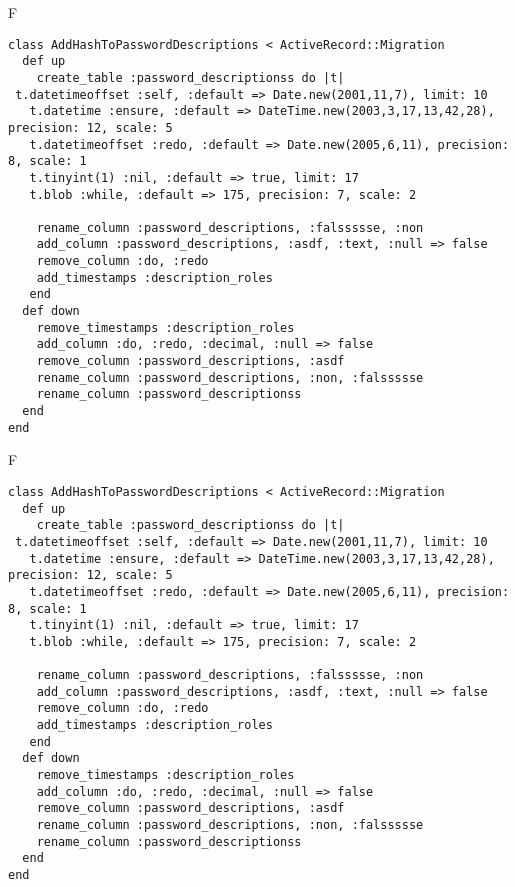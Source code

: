 F
\begin{verbatim}
class AddHashToPasswordDescriptions < ActiveRecord::Migration
  def up
    create_table :password_descriptionss do |t| 
 t.datetimeoffset :self, :default => Date.new(2001,11,7), limit: 10
   t.datetime :ensure, :default => DateTime.new(2003,3,17,13,42,28), precision: 12, scale: 5
   t.datetimeoffset :redo, :default => Date.new(2005,6,11), precision: 8, scale: 1
   t.tinyint(1) :nil, :default => true, limit: 17
   t.blob :while, :default => 175, precision: 7, scale: 2

    rename_column :password_descriptions, :falssssse, :non
    add_column :password_descriptions, :asdf, :text, :null => false
    remove_column :do, :redo
    add_timestamps :description_roles
   end
  def down
    remove_timestamps :description_roles
    add_column :do, :redo, :decimal, :null => false
    remove_column :password_descriptions, :asdf
    rename_column :password_descriptions, :non, :falssssse
    rename_column :password_descriptionss
  end
end
\end{verbatim}

F
\begin{verbatim}
class AddHashToPasswordDescriptions < ActiveRecord::Migration
  def up
    create_table :password_descriptionss do |t| 
 t.datetimeoffset :self, :default => Date.new(2001,11,7), limit: 10
   t.datetime :ensure, :default => DateTime.new(2003,3,17,13,42,28), precision: 12, scale: 5
   t.datetimeoffset :redo, :default => Date.new(2005,6,11), precision: 8, scale: 1
   t.tinyint(1) :nil, :default => true, limit: 17
   t.blob :while, :default => 175, precision: 7, scale: 2

    rename_column :password_descriptions, :falssssse, :non
    add_column :password_descriptions, :asdf, :text, :null => false
    remove_column :do, :redo
    add_timestamps :description_roles
   end
  def down
    remove_timestamps :description_roles
    add_column :do, :redo, :decimal, :null => false
    remove_column :password_descriptions, :asdf
    rename_column :password_descriptions, :non, :falssssse
    rename_column :password_descriptionss
  end
end
\end{verbatim}
